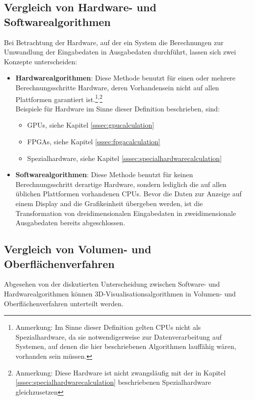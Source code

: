 \documentclass[pdftex,a4paper,titlepage,12pt]{scrartcl}
\newtheorem[L]{boxedDefinition}{Definition}
\begin{document}
\subsection{Vergleich von Hardware- und Softwarealgorithmen}\label{ssec:swhwcomparison}
Bei Betrachtung der Hardware, auf der ein System die Berechnungen zur Umwandlung der Eingabedaten in Ausgabedaten durchführt, lassen  sich zwei Konzepte unterscheiden:
\begin{itemize}
 \item \textbf{Hardwarealgorithmen}: Diese Methode benutzt für einen oder mehrere Berechnungsschritte Hardware, deren Vorhandensein nicht auf allen Plattformen garantiert ist.\footnote{Anmerkung: Im Sinne dieser Definition gelten CPUs nicht als Spezialhardware, da sie notwendigerweise zur Datenverarbeitung auf Systemen, auf denen die hier beschriebenen Algorithmen lauffähig  wären, vorhanden sein müssen.}\textsuperscript{,}\footnote{Anmerkung: Diese Hardware ist nicht zwangsläufig mit der in Kapitel \ref{sssec:specialhardwarecalculation} beschriebenen Spezialhardware gleichzusetzen}\\
 Beispiele für Hardware im Sinne dieser Definition beschrieben, sind:
 \begin{itemize}
  \item GPUs, siehe Kapitel \vref{sssec:gpucalculation} 
  \item FPGAs, siehe Kapitel \vref{sssec:fpgacalculation}
  \item Spezialhardware, siehe Kapitel \vref{sssec:specialhardwarecalculation}
 \end{itemize}
 \item \textbf{Softwarealgorithmen}: Diese Methode benutzt für keinen Berechnungsschritt derartige Hardware, sondern lediglich die auf allen üblichen Plattformen vorhandenen CPUs. Bevor die Daten zur Anzeige auf einem Display and die Grafikeinheit übergeben werden, ist die Transformation von dreidimensionalen Eingabedaten in zweidimensionale Ausgabedaten bereits abgeschlossen.
\end{itemize}

\subsection{Vergleich von Volumen- und Oberflächenverfahren}\label{ssec:volsurfacealgorithms}
Abgesehen von der diskutierten Unterscheidung zwischen Software- und Hardwarealgorithmen können 3D-Visualisationsalgorithmen in Volumen- und Oberflächenverfahren unterteilt werden.
\end{document}
